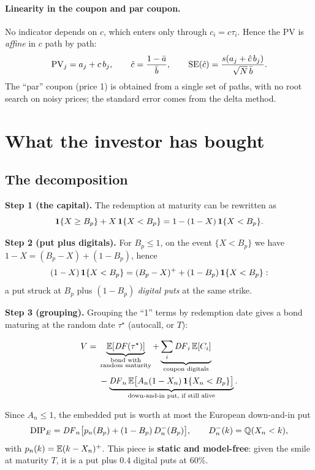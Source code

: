\paragraph{Linearity in the coupon and par coupon.} No indicator depends on $c$, which enters only through
$c_i=c\tau_i$. Hence the PV is \emph{affine} in $c$ path by path:
\begin{equation}
\mathrm{PV}_j=a_j+c\,b_j,\qquad
\hat c=\frac{1-\bar a}{\bar b},\qquad
\mathrm{SE}(\hat c)=\frac{s(a_j+\hat c\,b_j)}{\sqrt N\,\bar b}.
\end{equation}
The ``par'' coupon (price 1) is obtained from a single set of paths, with no root search on noisy prices; the standard
error comes from the delta method.

\section{What the investor has bought}
\subsection{The decomposition}
\noindent\textbf{Step 1 (the capital).} The redemption at maturity can be rewritten as
\[
\mathbf{1}\{X\ge B_p\}+X\,\mathbf{1}\{X<B_p\}=1-(1-X)\,\mathbf{1}\{X<B_p\}.
\]

\noindent\textbf{Step 2 (put plus digitals).} For $B_p\le1$, on the event $\{X<B_p\}$ we have
$1-X=(B_p-X)+(1-B_p)$, hence
\[
(1-X)\,\mathbf{1}\{X<B_p\}=(B_p-X)^++(1-B_p)\,\mathbf{1}\{X<B_p\}:
\]
a put struck at $B_p$ plus $(1-B_p)$ \emph{digital puts} at the same strike.

\noindent\textbf{Step 3 (grouping).} Grouping the ``1'' terms by redemption date gives a bond maturing at the random
date $\tau^\star$ (autocall, or $T$):
\begin{proposizione}[Decomposition]
\begin{equation}\label{eq:ac-scomposizione}
\begin{split}
V={}&\underbrace{\mathbb{E}[\mathit{DF}(\tau^\star)]}_{\substack{\text{bond with}\\\text{random maturity}}}
+\underbrace{\sum_i\mathit{DF}_i\,\mathbb{E}[C_i]}_{\text{coupon digitals}}\\
&-\underbrace{\mathit{DF}_n\,\mathbb{E}\big[A_n(1-X_n)\,\mathbf{1}\{X_n<B_p\}\big]}_{\text{down-and-in put, if still alive}} .
\end{split}
\end{equation}
\end{proposizione}
Since $A_n\le1$, the embedded put is worth at most the European down-and-in put
\begin{equation}\label{eq:dip}
\mathrm{DIP}_E=\mathit{DF}_n\big[p_n(B_p)+(1-B_p)\,D_n^-(B_p)\big],\qquad D_n^-(k)=\mathbb{Q}(X_n<k),
\end{equation}
with $p_n(k)=\mathbb{E}(k-X_n)^+$. This piece is \textbf{static and model-free}: given the smile at maturity $T$, it is a put
plus $0.4$ digital puts at 60\%.

